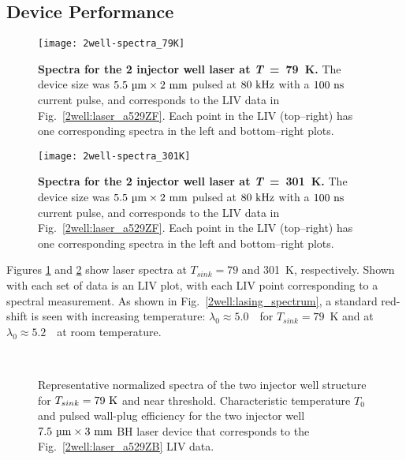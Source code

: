 \subsection{Device Performance}

\begin{figure}[tp]
\centering
\texttt{[image: 2well-spectra\_79K]}
\caption[Spectra for the 2 injector well laser at $T_{sink}=79~\tn{K}$]{\textnormal{\textbf{Spectra for the 2 injector well laser at \textit{T}~=~79~K.}}  The device size was $5.5~\tn{\um} \times 2~\tn{mm}$ pulsed at $80~\textnormal{kHz}$ with a $100~\textnormal{ns}$ current pulse, and corresponds to the LIV data in Fig.~\ref{2well:laser_a529ZF}.  Each point in the LIV (top--right) has one corresponding spectra in the left and bottom--right plots.}
\label{2well:spectra_79K}
\end{figure}

\begin{figure}[tp]
\centering
\texttt{[image: 2well-spectra\_301K]}
\caption[Spectra for the 2 injector well laser at $T_{sink}=301~\tn{K}$]{\textnormal{\textbf{Spectra for the 2 injector well laser at \textit{T}~=~301~K.}}  The device size was $5.5~\tn{\um} \times 2~\tn{mm}$ pulsed at $80~\textnormal{kHz}$ with a $100~\textnormal{ns}$ current pulse, and corresponds to the LIV data in Fig.~\ref{2well:laser_a529ZF}.  Each point in the LIV (top--right) has one corresponding spectra in the left and bottom--right plots.}
\label{2well:spectra_301K}
\end{figure}

Figures \ref{2well:spectra_79K} and \ref{2well:spectra_301K} show laser spectra at $T_{sink}=79$ and 301~K, respectively.  Shown with each set of data is an LIV plot, with each LIV point corresponding to a spectral measurement.  As shown in Fig.~\ref{2well:lasing_spectrum}, a standard red-shift is seen with increasing temperature: $\lambda_0\approx5.0$~\um\ for $T_{sink}=79$~K and at $\lambda_0\approx5.2$~\um\ at room temperature.

\begin{figure}[tp]%
\centering%
%
\\%
\vspace*{-0.1in}%
%
\hfil%
%
\caption[Performance data for the two injector well structure]{  Representative normalized spectra of the two injector well structure for $T_{sink}=79~\tn{K}$ and  near threshold.  Characteristic temperature $T_0$  and pulsed wall-plug efficiency  for the two injector well $7.5~\tn{\um}\times3~\tn{mm}$ BH laser device that corresponds to the Fig.~\ref{2well:laser_a529ZB} LIV data.}%
\label{2well:performance}%
\end{figure}

